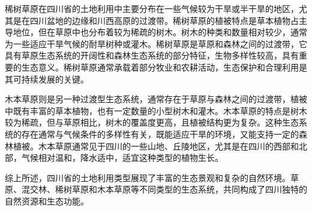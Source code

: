 \documentclass{article}
\begin{document}
		稀树草原在四川省的土地利用中主要分布在一些气候较为干旱或半干旱的地区，尤其是在四川盆地的边缘和川西高原的过渡带。稀树草原的植被特点是草本植物占主导地位，但在草原中也分布着较为稀疏的树木。树木的种类和数量相对较少，通常为一些适应干旱气候的耐旱树种或灌木。稀树草原是草原和森林之间的过渡带，它具有草原生态系统的开阔性和森林生态系统的部分特征，生物多样性较高，具有重要的生态意义。稀树草原通常承载着部分牧业和农耕活动，生态保护和合理利用是其可持续发展的关键。
		
		木本草原则是另一种过渡型生态系统，通常存在于草原与森林之间的过渡带，植被中既有丰富的草本植物，也有一定数量的小型树木和灌木。木本草原的特点是树木较为稀疏，但与草原相比，树木的覆盖度更高，且植被结构更为复杂。这种生态系统的存在通常与气候条件的多样性有关，既能适应干旱的环境，又能支持一定的森林植被。木本草原通常见于四川的一些山地、丘陵地区，尤其是在四川的西部和北部，气候相对温和，降水适中，适宜这种类型的植物生长。
		
		综上所述，四川省的土地利用类型展现了丰富的生态景观和复杂的自然环境。草原、混交林、稀树草原和木本草原等不同类型的生态系统，共同构成了四川独特的自然资源和生态功能。
		
\end{document}
